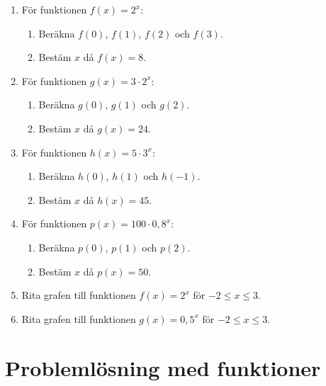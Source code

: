 \documentclass[a4paper,11pt]{article}
\begin{document}
\begin{enumerate}[label=\textbf{\arabic*.}]
    \item För funktionen $f(x) = 2^x$:
    \begin{enumerate}[label=\alph*)]
        \item Beräkna $f(0)$, $f(1)$, $f(2)$ och $f(3)$.
        \item Bestäm $x$ då $f(x) = 8$.
    \end{enumerate}
    
    \item För funktionen $g(x) = 3 \cdot 2^x$:
    \begin{enumerate}[label=\alph*)]
        \item Beräkna $g(0)$, $g(1)$ och $g(2)$.
        \item Bestäm $x$ då $g(x) = 24$.
    \end{enumerate}
    
    \item För funktionen $h(x) = 5 \cdot 3^x$:
    \begin{enumerate}[label=\alph*)]
        \item Beräkna $h(0)$, $h(1)$ och $h(-1)$.
        \item Bestäm $x$ då $h(x) = 45$.
    \end{enumerate}
    
    \item För funktionen $p(x) = 100 \cdot 0,8^x$:
    \begin{enumerate}[label=\alph*)]
        \item Beräkna $p(0)$, $p(1)$ och $p(2)$.
        \item Bestäm $x$ då $p(x) = 50$.
    \end{enumerate}
    
    \item Rita grafen till funktionen $f(x) = 2^x$ för $-2 \leq x \leq 3$.
    
    \item Rita grafen till funktionen $g(x) = 0,5^x$ för $-2 \leq x \leq 3$.
\end{enumerate}

\newpage
\section*{Problemlösning med funktioner}
\end{document}
